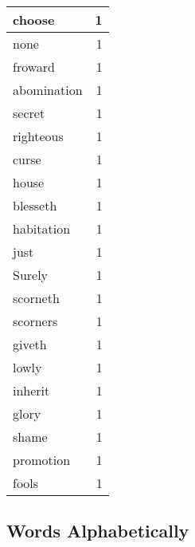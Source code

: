 \begin{center}
\begin{longtable}{l|r}
choose & 1\\ \hline 
none & 1\\ \hline 
froward & 1\\ \hline 
abomination & 1\\ \hline 
secret & 1\\ \hline 
righteous & 1\\ \hline 
curse & 1\\ \hline 
house & 1\\ \hline 
blesseth & 1\\ \hline 
habitation & 1\\ \hline 
just & 1\\ \hline 
Surely & 1\\ \hline 
scorneth & 1\\ \hline 
scorners & 1\\ \hline 
giveth & 1\\ \hline 
lowly & 1\\ \hline 
inherit & 1\\ \hline 
glory & 1\\ \hline 
shame & 1\\ \hline 
promotion & 1\\ \hline 
fools & 1\\ \hline 
\end{longtable}  
\end{center}  


  
\normalsize  

  
  


\subsection{Words Alphabetically}

